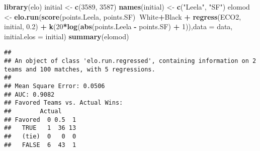 \documentclass[]{article}
\newenvironment{Shaded}{\begin{snugshade}}{\end{snugshade}}
\newcommand{\ControlFlowTok}[1]{\textcolor[rgb]{0.13,0.29,0.53}{\textbf{#1}}}
\newcommand{\DataTypeTok}[1]{\textcolor[rgb]{0.13,0.29,0.53}{#1}}
\newcommand{\DecValTok}[1]{\textcolor[rgb]{0.00,0.00,0.81}{#1}}
\newcommand{\FloatTok}[1]{\textcolor[rgb]{0.00,0.00,0.81}{#1}}
\newcommand{\KeywordTok}[1]{\textcolor[rgb]{0.13,0.29,0.53}{\textbf{#1}}}
\newcommand{\NormalTok}[1]{#1}
\newcommand{\OperatorTok}[1]{\textcolor[rgb]{0.81,0.36,0.00}{\textbf{#1}}}
\newcommand{\StringTok}[1]{\textcolor[rgb]{0.31,0.60,0.02}{#1}}
\begin{document}
\begin{Shaded}
\begin{Highlighting}[]
\KeywordTok{library}\NormalTok{(elo)}
\NormalTok{initial <-}\StringTok{ }\KeywordTok{c}\NormalTok{(}\DecValTok{3589}\NormalTok{, }\DecValTok{3587}\NormalTok{)}
\KeywordTok{names}\NormalTok{(initial) <-}\StringTok{ }\KeywordTok{c}\NormalTok{(}\StringTok{"Leela"}\NormalTok{, }\StringTok{"SF"}\NormalTok{)}
\NormalTok{elomod <-}\StringTok{ }\KeywordTok{elo.run}\NormalTok{(}\KeywordTok{score}\NormalTok{(points.Leela, points.SF)}\OperatorTok{~}\NormalTok{White}\OperatorTok{+}\NormalTok{Black }\OperatorTok{+}\StringTok{ }\KeywordTok{regress}\NormalTok{(ECO2, initial, }\FloatTok{0.2}\NormalTok{) }\OperatorTok{+}\StringTok{ }\KeywordTok{k}\NormalTok{(}\DecValTok{20}\OperatorTok{*}\KeywordTok{log}\NormalTok{(}\KeywordTok{abs}\NormalTok{(points.Leela }\OperatorTok{-}\StringTok{ }\NormalTok{points.SF) }\OperatorTok{+}\StringTok{ }\DecValTok{1}\NormalTok{)),}\DataTypeTok{data =}\NormalTok{ data, }\DataTypeTok{initial.elos =}\NormalTok{ initial)}
\KeywordTok{summary}\NormalTok{(elomod)}
\end{Highlighting}
\end{Shaded}

\begin{verbatim}
## 
## An object of class 'elo.run.regressed', containing information on 2 teams and 100 matches, with 5 regressions.
## 
## Mean Square Error: 0.0506
## AUC: 0.9082
## Favored Teams vs. Actual Wins: 
##        Actual
## Favored  0 0.5  1
##   TRUE   1  36 13
##   (tie)  0   0  0
##   FALSE  6  43  1
\end{verbatim}

\begin{Shaded}
\end{Shaded}
\end{document}
